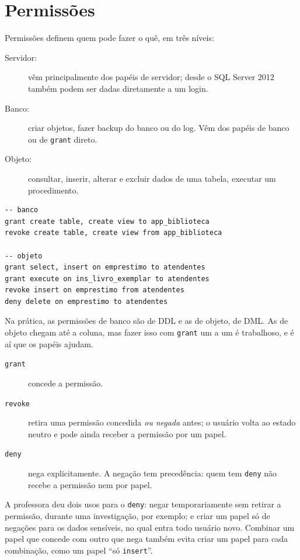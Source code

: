 \section{Permissões}

Permissões definem quem pode fazer o quê, em três níveis:

\begin{description}
	\item[Servidor:] vêm principalmente dos papéis de servidor; desde o
	SQL Server 2012 também podem ser dadas diretamente a um login.
	\item[Banco:] criar objetos, fazer backup do banco ou do log. Vêm dos
	papéis de banco ou de \texttt{grant} direto.
	\item[Objeto:] consultar, inserir, alterar e excluir dados de uma
	tabela, executar um procedimento.
\end{description}

\begin{lstlisting}
-- banco
grant create table, create view to app_biblioteca
revoke create table, create view from app_biblioteca

-- objeto
grant select, insert on emprestimo to atendentes
grant execute on ins_livro_exemplar to atendentes
revoke insert on emprestimo from atendentes
deny delete on emprestimo to atendentes
\end{lstlisting}

Na prática, as permissões de banco são de DDL e as de objeto, de DML.
As de objeto chegam até a coluna, mas fazer isso com \texttt{grant} um a
um é trabalhoso, e é aí que os papéis ajudam.

\begin{description}
	\item[\texttt{grant}] concede a permissão.
	\item[\texttt{revoke}] retira uma permissão concedida \emph{ou
	negada} antes; o usuário volta ao estado neutro e pode ainda receber
	a permissão por um papel.
	\item[\texttt{deny}] nega explicitamente. A negação tem precedência:
	quem tem \texttt{deny} não recebe a permissão nem por papel.
\end{description}

A professora deu dois usos para o \texttt{deny}: negar temporariamente
sem retirar a permissão, durante uma investigação, por exemplo; e criar
um papel só de negações para os dados sensíveis, no qual entra todo
usuário novo. Combinar um papel que concede com outro que nega também
evita criar um papel para cada combinação, como um papel ``só
\texttt{insert}''.

